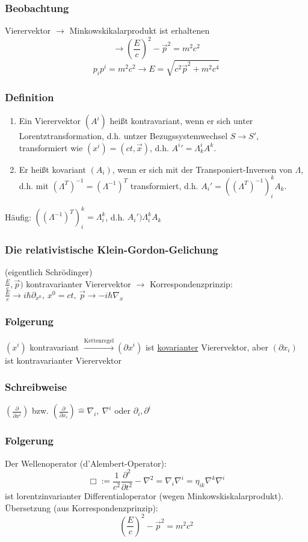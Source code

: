 \documentclass[twoside,a4paper]{scrartcl}
\renewcommand{\1}{\mathds{1}}
\newcommand{\ra}{\rightarrow}
\newcommand{\entspricht}{\mathrel{\widehat{=}}}
\renewcommand{\L}{\Lambda}
\begin{document}
\subsubsection*{Beobachtung}
Vierervektor $\ra$ Minkowskikalarprodukt ist erhaltenen
$$\ra (\frac{E}{c})^2-\vec p^2=m^2c^2$$
$$p_ip^i=m^2c^2 \ra E=\sqrt{c^2\vec p^2+m^2c^4}$$

\subsubsection*{Definition}
\begin{enumerate}
\item Ein Vierervektor $(A^i)$ heißt kontravariant, wenn er sich unter Lorentztransformation, d.h. untzer Bezugssystemwechsel $S \ra S'$, transformiert wie $(x^i)=(ct,\vec x)$, d.h. ${A^i}'=\L_k^iA^k$.
\item Er heißt kovariant $(A_i)$, wenn er sich mit der Transponiert-Inversen von $\L$, d.h. mit $(\L^T)^{-1}=(\L^{-1})^T$ transformiert, d.h. $A_i'=((\L^T)^{-1})^k_i A_k$.
\end{enumerate}
Häufig:
$((\L^{-1})^T)^k_i=\L_i^k$, d.h. $A_i') \L_i^k A_k$
\subsubsection{Die relativistische Klein-Gordon-Gelichung}
(eigentlich Schrödinger)\\
$\frac{E}{c}, \vec p)$ kontravarianter Vierervektor $\ra$ Korrespondenzprinzip:\\ $\frac{E}{c} \ra i\hbar \partial_{x^0}, \ x^0=ct, \ \vec p \ra -i \hbar \nabla_x$
\subsubsection*{Folgerung}
$(x^i)$ kontravariant $\stackrel{\mathrm{Kettenregel}}{\ra} (\partial x^i)$ ist \underline{kovarianter} Vierervektor, aber $(\partial x_i)$ ist kontravarianter Vierervektor
\subsubsection*{Schreibweise}
$(\frac{\partial}{\partial x^i})$ bzw. $(\frac{\partial}{\partial x_i})\entspricht \nabla_i, \ \nabla^i$ oder $\partial_i,\partial^i$
\subsubsection*{Folgerung}
Der Wellenoperator (d'Alembert-Operator):
$$\Box:= \frac{1}{c^2} \frac{\partial^2}{\partial t^2}-\nabla^2=\nabla_i\nabla^i=\eta_{ik} \nabla^k \nabla^i$$
ist lorentzinvarianter Differentialoperator (wegen Minkowskiskalarprodukt).\\
Übersetzung (aus Korrespondenzprinzip):
$$(\frac{E}{c})^2-\vec p^2=m^2c^2$$
\end{document}

